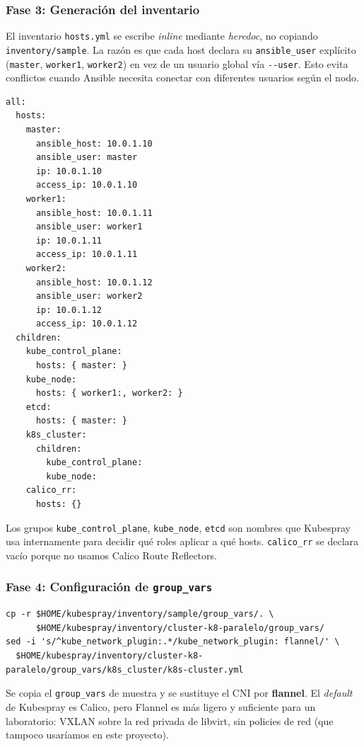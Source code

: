 \subsubsection{Fase 3: Generación del inventario}

El inventario \texttt{hosts.yml} se escribe \emph{inline} mediante \emph{heredoc}, no copiando \texttt{inventory/sample}. La razón es que cada host declara su \texttt{ansible\_user} explícito (\texttt{master}, \texttt{worker1}, \texttt{worker2}) en vez de un usuario global vía \texttt{-{}-user}. Esto evita conflictos cuando Ansible necesita conectar con diferentes usuarios según el nodo.

\begin{lstlisting}[style=bash]
all:
  hosts:
    master:
      ansible_host: 10.0.1.10
      ansible_user: master
      ip: 10.0.1.10
      access_ip: 10.0.1.10
    worker1:
      ansible_host: 10.0.1.11
      ansible_user: worker1
      ip: 10.0.1.11
      access_ip: 10.0.1.11
    worker2:
      ansible_host: 10.0.1.12
      ansible_user: worker2
      ip: 10.0.1.12
      access_ip: 10.0.1.12
  children:
    kube_control_plane:
      hosts: { master: }
    kube_node:
      hosts: { worker1:, worker2: }
    etcd:
      hosts: { master: }
    k8s_cluster:
      children:
        kube_control_plane:
        kube_node:
    calico_rr:
      hosts: {}
\end{lstlisting}

Los grupos \texttt{kube\_control\_plane}, \texttt{kube\_node}, \texttt{etcd} son nombres que Kubespray usa internamente para decidir qué roles aplicar a qué hosts. \texttt{calico\_rr} se declara vacío porque no usamos Calico Route Reflectors.

\subsubsection{Fase 4: Configuración de \texttt{group\_vars}}

\begin{lstlisting}[style=bash]
cp -r $HOME/kubespray/inventory/sample/group_vars/. \
      $HOME/kubespray/inventory/cluster-k8-paralelo/group_vars/
sed -i 's/^kube_network_plugin:.*/kube_network_plugin: flannel/' \
  $HOME/kubespray/inventory/cluster-k8-paralelo/group_vars/k8s_cluster/k8s-cluster.yml
\end{lstlisting}

Se copia el \texttt{group\_vars} de muestra y se sustituye el CNI por \textbf{flannel}. El \emph{default} de Kubespray es Calico, pero Flannel es más ligero y suficiente para un laboratorio: VXLAN sobre la red privada de libvirt, sin policies de red (que tampoco usaríamos en este proyecto).

